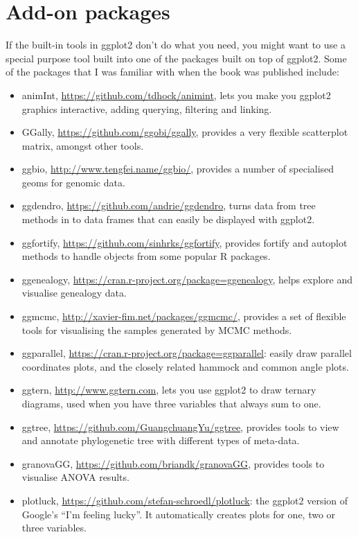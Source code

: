 \hypertarget{sec:elsewhere}{%
\section{Add-on packages}\label{sec:elsewhere}}

If the built-in tools in ggplot2 don't do what you need, you might want
to use a special purpose tool built into one of the packages built on
top of ggplot2. Some of the packages that I was familiar with when the
book was published include:

\begin{itemize}
\item
  animInt, \url{https://github.com/tdhock/animint}, lets you make you
  ggplot2 graphics interactive, adding querying, filtering and linking.
\item
  GGally, \url{https://github.com/ggobi/ggally}, provides a very
  flexible scatterplot matrix, amongst other tools.
\item
  ggbio, \url{http://www.tengfei.name/ggbio/}, provides a number of
  specialised geoms for genomic data.
\item
  ggdendro, \url{https://github.com/andrie/ggdendro}, turns data from
  tree methods in to data frames that can easily be displayed with
  ggplot2.
\item
  ggfortify, \url{https://github.com/sinhrks/ggfortify}, provides
  fortify and autoplot methods to handle objects from some popular R
  packages.
\item
  ggenealogy, \url{https://cran.r-project.org/package=ggenealogy}, helps
  explore and visualise genealogy data.
\item
  ggmcmc, \url{http://xavier-fim.net/packages/ggmcmc/}, provides a set
  of flexible tools for visualising the samples generated by MCMC
  methods.
\item
  ggparallel, \url{https://cran.r-project.org/package=ggparallel}:
  easily draw parallel coordinates plots, and the closely related
  hammock and common angle plots.
\item
  ggtern, \url{http://www.ggtern.com}, lets you use ggplot2 to draw
  ternary diagrams, used when you have three variables that always sum
  to one.
\item
  ggtree, \url{https://github.com/GuangchuangYu/ggtree}, provides tools
  to view and annotate phylogenetic tree with different types of
  meta-data.
\item
  granovaGG, \url{https://github.com/briandk/granovaGG}, provides tools
  to visualise ANOVA results.
\item
  plotluck, \url{https://github.com/stefan-schroedl/plotluck}: the
  ggplot2 version of Google's ``I'm feeling lucky''. It automatically
  creates plots for one, two or three variables.
\end{itemize}

